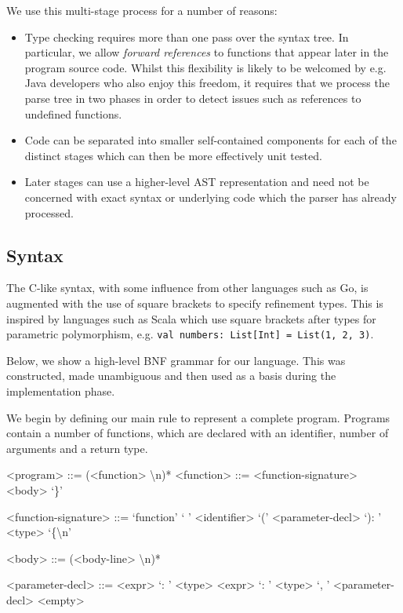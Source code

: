 \documentclass[a4paper,openany,12pt]{book}
\begin{document}
We use this multi-stage process for a number of reasons:

\begin{itemize}
    \item Type checking requires more than one pass over the syntax tree.
          In particular, we allow \emph{forward references} to functions that appear later in the program source code.
          Whilst this flexibility is likely to be welcomed by e.g. Java developers who also enjoy this freedom,
          it requires that we process the parse tree in two phases in order to detect issues such as references to
          undefined functions.
    \item Code can be separated into smaller self-contained components for each of the distinct stages
          which can then be more effectively unit tested.
    \item Later stages can use a higher-level AST representation and need not be concerned with exact syntax or
          underlying code which the parser has already processed.
\end{itemize}


\subsection{Syntax}\label{subsec:syntax}

The C-like syntax, with some influence from other languages such as Go, is augmented with the use of square brackets
to specify refinement types.
This is inspired by languages such as Scala which use square brackets after types for parametric polymorphism,
e.g. \texttt{val numbers: List[Int] = List(1, 2, 3)}.

Below, we show a high-level BNF grammar for our language.
This was constructed, made unambiguous and then used as a basis during the implementation phase.

\setlength{\grammarparsep}{20pt plus 1pt minus 1pt} %
\setlength{\grammarindent}{12em} %

We begin by defining our main rule to represent a complete program.
Programs contain a number of functions, which are declared with an identifier, number of arguments and a return type.

\begin{grammar}
    <program> ::= (<function> \textbackslash n)*
    <function> ::= <function-signature> <body> `\}'

    <function-signature> ::= `function' ` ' <identifier> `(' <parameter-decl> `): ' <type> `\{\textbackslash n'

    <body> ::= (<body-line> \textbackslash n)*

    <parameter-decl> ::= <expr> `: ' <type>
    \alt <expr> `: ' <type> `, ' <parameter-decl>
    \alt <empty>
\end{grammar}
\end{document}
